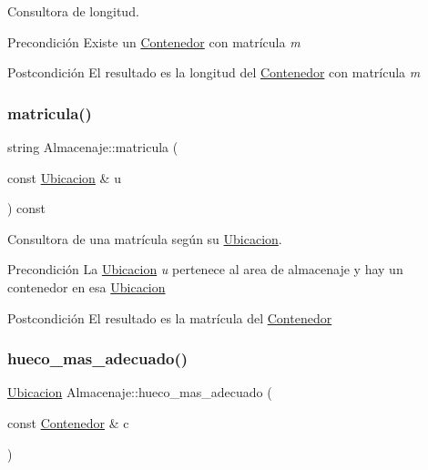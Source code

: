 Consultora de longitud. 

\begin{DoxyPrecond}{Precondición}
Existe un \hyperlink{class_contenedor}{Contenedor} con matrícula {\itshape m} 
\end{DoxyPrecond}
\begin{DoxyPostcond}{Postcondición}
El resultado es la longitud del \hyperlink{class_contenedor}{Contenedor} con matrícula {\itshape m} 
\end{DoxyPostcond}
\mbox{\label{class_almacenaje_a57347af1a15e11fa1e2a71621f867c0f}} 
\subsubsection{\texorpdfstring{matricula()}{matricula()}}
{\footnotesize\ttfamily string Almacenaje\+::matricula (\begin{DoxyParamCaption}\item[{const \hyperlink{class_ubicacion}{Ubicacion} \&}]{u }\end{DoxyParamCaption}) const}



Consultora de una matrícula según su \hyperlink{class_ubicacion}{Ubicacion}. 

\begin{DoxyPrecond}{Precondición}
La \hyperlink{class_ubicacion}{Ubicacion} {\itshape u} pertenece al area de almacenaje y hay un contenedor en esa \hyperlink{class_ubicacion}{Ubicacion} 
\end{DoxyPrecond}
\begin{DoxyPostcond}{Postcondición}
El resultado es la matrícula del \hyperlink{class_contenedor}{Contenedor} 
\end{DoxyPostcond}
\mbox{\label{class_almacenaje_a8a62209a8e83a59eb900913c3dc5f377}} 
\subsubsection{\texorpdfstring{hueco\+\_\+mas\+\_\+adecuado()}{hueco\_mas\_adecuado()}}
{\footnotesize\ttfamily \hyperlink{class_ubicacion}{Ubicacion} Almacenaje\+::hueco\+\_\+mas\+\_\+adecuado (\begin{DoxyParamCaption}\item[{const \hyperlink{class_contenedor}{Contenedor} \&}]{c }\end{DoxyParamCaption})}



